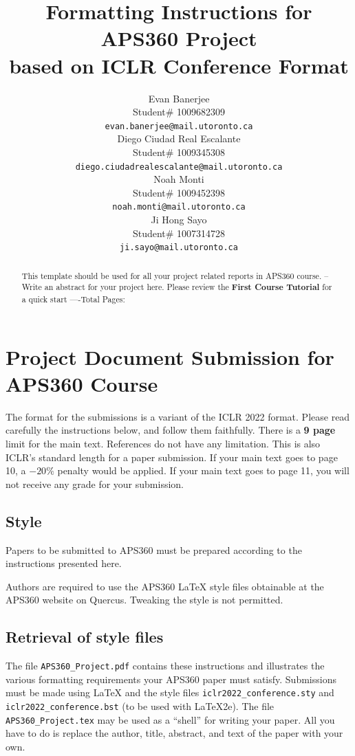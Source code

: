 \documentclass{article} %
\title{Formatting Instructions for APS360 Project  \\ 
based on ICLR Conference Format}
\author{Evan Banerjee  \\
Student\# 1009682309\\
\texttt{evan.banerjee@mail.utoronto.ca} \\
\And
Diego Ciudad Real Escalante  \\
Student\# 1009345308 \\
\texttt{diego.ciudadrealescalante@mail.utoronto.ca} \\
\AND
Noah Monti  \\
Student\# 1009452398 \\
\texttt{noah.monti@mail.utoronto.ca} \\
\And
Ji Hong Sayo \\
Student\# 1007314728 \\
\texttt{ji.sayo@mail.utoronto.ca} \\
\AND
}
\begin{document}
\maketitle

\begin{abstract}
This template should be used for all your project related reports in APS360 course. -- Write an abstract for your project here. Please review the \textbf{ First Course Tutorial} for a quick start
----Total Pages: \pageref{last_page}
\end{abstract}



\section{Project Document Submission for APS360 Course}


The format for the submissions is a variant of the ICLR 2022 format.
Please read carefully the instructions below, and follow them
faithfully. There is a \textbf{9 page} limit for the main text. References do not have any limitation. This is also ICLR's standard length for a paper submission. 
If your main text goes to page 10, a $-20\%$ penalty would be applied. If your main text goes to page 11, you will not receive any grade for your submission. 

\subsection{Style}

Papers to be submitted to APS360 must be prepared according to the
instructions presented here.

Authors are required to use the APS360 \LaTeX{} style files obtainable at the
APS360 website on Quercus. Tweaking the style is not permitted.

\subsection{Retrieval of style files}

The file \verb+APS360_Project.pdf+ contains these
instructions and illustrates the various formatting requirements your APS360 paper must satisfy.
Submissions must be made using \LaTeX{} and the style files
\verb+iclr2022_conference.sty+ and \verb+iclr2022_conference.bst+ (to be used with \LaTeX{}2e). The file
\verb+APS360_Project.tex+ may be used as a ``shell'' for writing your paper. All you have to do is replace the author, title, abstract, and text of the paper with
your own.
\end{document}
